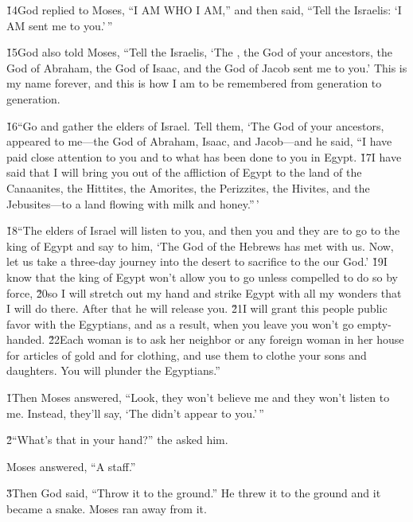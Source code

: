 \v{14}God replied to Moses, ``I AM WHO I AM,'' and then said, ``Tell the Israelis: `I AM sent me to you.'\,''

\v{15}God also told Moses, ``Tell the Israelis, `The , the God of your ancestors, the God of Abraham, the God of Isaac, and the God of Jacob sent me to you.' This is my name forever, and this is how I am to be remembered from generation to generation.

\v{16}``Go and gather the elders of Israel. Tell them, `The  God of your ancestors, appeared to me---the God of Abraham, Isaac, and Jacob---and he said, ``I have paid close attention to you and to what has been done to you in Egypt. \v{17}I have said that I will bring you out of the affliction of Egypt to the land of the Canaanites, the Hittites, the Amorites, the Perizzites, the Hivites, and the Jebusites---to a land flowing with milk and honey.''\,'

\v{18}``The elders of Israel will listen to you, and then you and they are to go to the king of Egypt and say to him, `The  God of the Hebrews has met with us. Now, let us take a three-day journey into the desert to sacrifice to the  our God.' \v{19}I know that the king of Egypt won't allow you to go unless compelled to do so by force, \v{20}so I will stretch out my hand and strike Egypt with all my wonders that I will do there. After that he will release you. \v{21}I will grant this people public favor with the Egyptians, and as a result, when you leave you won't go empty-handed. \v{22}Each woman is to ask her neighbor or any foreign woman in her house for articles of gold and for clothing, and use them to clothe your sons and daughters. You will plunder the Egyptians.''

\v{1}Then Moses answered, ``Look, they won't believe me and they won't listen to me. Instead, they'll say, `The  didn't appear to you.'\,''

\v{2}``What's that in your hand?'' the  asked him.

Moses answered, ``A staff.''

\v{3}Then God said, ``Throw it to the ground.'' He threw it to the ground and it became a snake. Moses ran away from it.

